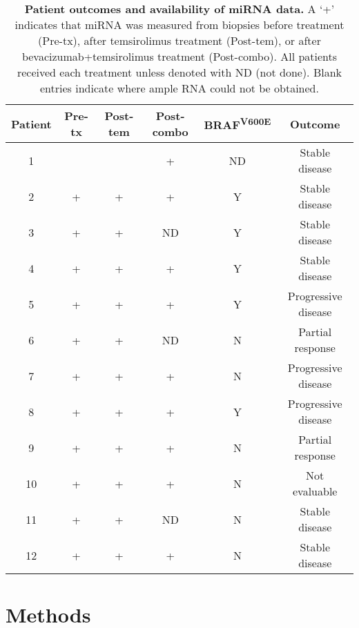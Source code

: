 \begin{table}
\begin{center}
\begin{tabular}{ c c c c c c }
Patient & Pre-tx & Post-tem & Post-combo & BRAF\textsuperscript{V600E} & Outcome \\ \hline
1 &   &   & + & ND    & Stable disease \\
2 & + & + & + & Y & Stable disease \\
3 & + & + & ND & Y & Stable disease \\
4 & + & + & + & Y & Stable disease \\
5 & + & + & + & Y & Progressive disease \\
6 & + & + & ND & N & Partial response \\
7 & + & + & + & N & Progressive disease \\
8 & + & + & + & Y & Progressive disease \\
9 & + & + & + & N & Partial response \\
10 & + & + & + & N & Not evaluable \\
11 & + & + & ND & N & Stable disease \\
12 & + & + & + & N & Stable disease \\
\end{tabular}
\end{center}
\caption[Patient outcomes and availability of miRNA data]{
    \textbf{Patient outcomes and availability of miRNA data.}
    A `+' indicates that miRNA was measured from biopsies 
    before treatment (Pre-tx), after temsirolimus treatment (Post-tem),
    or after bevacizumab+temsirolimus treatment (Post-combo). All patients
    received each treatment unless denoted with ND (not done). Blank entries indicate where
    ample RNA could not be obtained.}
\label{jtm:table1}
\end{table}

\section{Methods}

